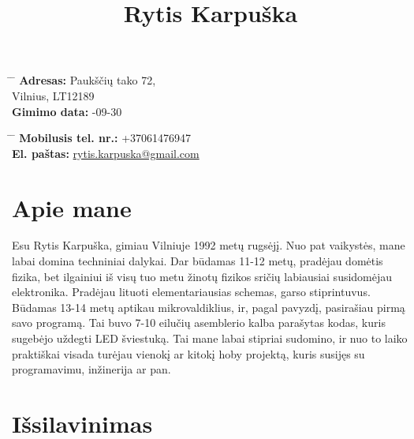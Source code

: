 \documentclass[12]{article}
\begin{document}
\title{Rytis Karpuška}


\parbox{0.5\textwidth}{ %
\begin{tabbing} %
\hspace{3cm} \= \hspace{4cm} \= \kill %
{\bf Adresas:} \> Paukščių tako 72,\\ %
\> Vilnius, LT12189\\ %
{\bf Gimimo data:} -09-30\\ %
\end{tabbing}}
\hfill %
\parbox{0.5\textwidth}{ %
\begin{tabbing} %
\hspace{3cm} \= \hspace{4cm} \= \kill %
{\bf Mobilusis tel. nr.:} \> +37061476947 \\ %
{\bf El. paštas:} \> \href{mailto:rytis.karpuska@gmail.com}{rytis.karpuska@gmail.com} \\ %
\end{tabbing}}

\section{Apie mane}

Esu Rytis Karpuška, gimiau Vilniuje 1992 metų rugsėjį. Nuo pat vaikystės, mane labai domina techniniai dalykai.
Dar būdamas 11-12 metų, pradėjau domėtis fizika, bet ilgainiui iš visų tuo metu žinotų fizikos sričių labiausiai susidomėjau elektronika.
Pradėjau lituoti elementariausias schemas, garso stiprintuvus.
Būdamas 13-14 metų aptikau mikrovaldiklius, ir, pagal pavyzdį, pasirašiau pirmą savo programą.
Tai buvo 7-10 eilučių asemblerio kalba parašytas kodas, kuris sugebėjo uždegti LED šviestuką.
Tai mane labai stipriai sudomino, ir nuo to laiko praktiškai visada turėjau vienokį ar kitokį hoby projektą, kuris susijęs su programavimu, inžinerija ar pan.


\section{Išsilavinimas}

\end{document}
